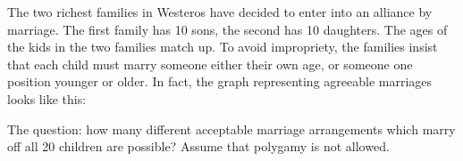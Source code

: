\documentclass[11pt]{exam}
\newcommand{\vtx}[2]{node[fill,circle,inner sep = 0 pt, minimum size=4 pt,label=#1:#2]{}}
\renewcommand{\v}{\vtx{above}{}}
\begin{document}

\noindent The two richest families in Westeros have decided to enter into an alliance by marriage.  The first family has 10 sons, the second has 10 daughters.  The ages of the kids in the two families match up.   To avoid impropriety, the families insist that each child must marry someone either their own age, or someone one position younger or older.  In fact, the graph representing agreeable marriages looks like this:

\begin{center}
\end{center}

The question: how many different acceptable marriage arrangements which marry off all 20 children are possible?  Assume that polygamy is not allowed.
\end{document}
